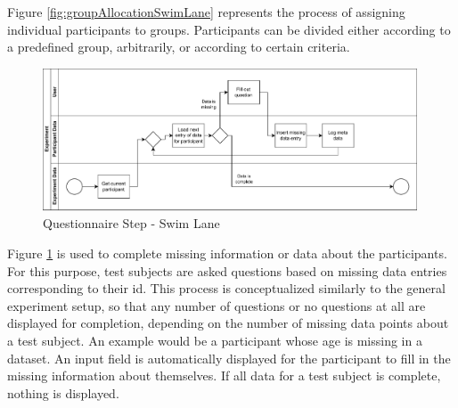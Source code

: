 
\newpage

Figure \ref{fig:groupAllocationSwimLane} represents the process of assigning individual participants to groups. Participants can be divided either according to a predefined group, arbitrarily, or according to certain criteria.


\begin{figure}[htbp]
    \centering
    \includegraphics[width=0.99\textwidth, keepaspectratio]{content/05_design_and_dev_artefacts/QuestionairSwimLane.drawio.pdf}
    \caption{Questionnaire Step - Swim Lane}    
    \label{fig:questionairSwimLane}
\end{figure}


Figure \ref{fig:questionairSwimLane} is used to complete missing information or data about the participants. For this purpose, test subjects are asked questions based on missing data entries corresponding to their \ac{id}. This process is conceptualized similarly to the general experiment setup, so that any number of questions or no questions at all are displayed for completion, depending on the number of missing data points about a test subject. An example would be a participant whose age is missing in a dataset. An input field is automatically displayed for the participant to fill in the missing information about themselves. If all data for a test subject is complete, nothing is displayed.


